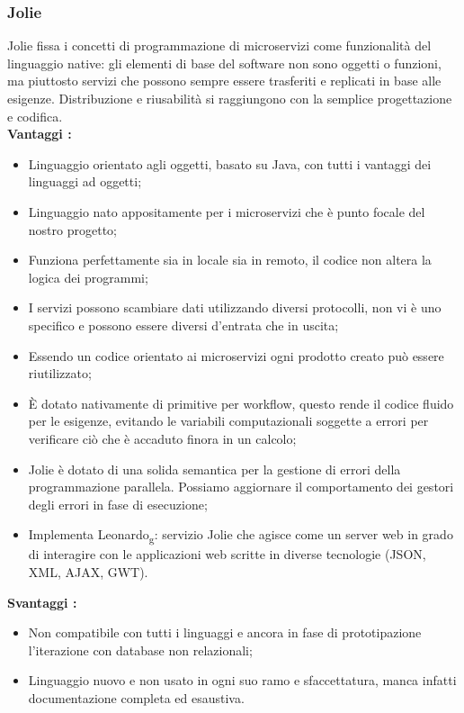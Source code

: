 {{		\subsubsection{Jolie}{
			Jolie fissa i concetti di programmazione di microservizi come funzionalità del linguaggio native: gli elementi di base del software non sono oggetti o funzioni, ma piuttosto servizi che possono sempre essere trasferiti e replicati in base alle esigenze. Distribuzione e riusabilità si raggiungono con la semplice progettazione e codifica.\\
			\textbf{Vantaggi :}
			\begin{itemize}\itemsep1pt
				\item Linguaggio orientato agli oggetti, basato su Java, con tutti i vantaggi dei linguaggi ad oggetti;
				\item Linguaggio nato appositamente per i microservizi che è punto focale del nostro progetto;
				\item Funziona perfettamente sia in locale sia in remoto, il codice non altera la logica dei programmi;
				\item I servizi possono scambiare dati utilizzando diversi protocolli, non vi è uno specifico e possono essere diversi d'entrata che in uscita;
				\item Essendo un codice orientato ai microservizi ogni prodotto creato può essere riutilizzato;
				\item È dotato nativamente di primitive per workflow, questo rende il codice fluido per le esigenze, evitando le variabili computazionali soggette a errori per verificare ciò che è accaduto finora in un calcolo;
				\item Jolie è dotato di una solida semantica per la gestione di errori della programmazione parallela. Possiamo  aggiornare il comportamento dei gestori degli errori in fase di esecuzione;
				\item Implementa Leonardo\textsubscript{g}: servizio Jolie che agisce come un server web in grado di interagire con le applicazioni web scritte in diverse tecnologie (JSON, XML, AJAX, GWT). 
			\end{itemize}
			\textbf{Svantaggi :}
			\begin{itemize}\itemsep1pt
				\item Non compatibile con tutti i linguaggi e ancora in fase di prototipazione l'iterazione con database non relazionali;
				\item Linguaggio nuovo e non usato in ogni suo ramo e sfaccettatura, manca infatti documentazione completa ed esaustiva.
			\end{itemize}
		}
}}
